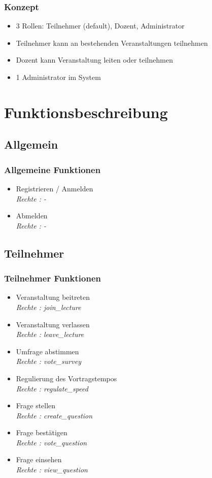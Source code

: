 \documentclass[german,a4paper]{beamer}
\begin{document}
\begin{frame} 
\frametitle{Konzept}
\begin{itemize}
  \item{}
  3 Rollen: Teilnehmer (default), Dozent, Administrator
  \item
  Teilnehmer kann an bestehenden Veranstaltungen teilnehmen
  \item{}
  Dozent kann Veranstaltung leiten oder teilnehmen
  \item{}
  1 Administrator im System 
\end{itemize}
\end{frame}

\section{Funktionsbeschreibung}
\subsection{Allgemein}
\begin{frame} 
\frametitle{Allgemeine Funktionen}
\begin{itemize}
  \item{}
  Registrieren / Anmelden \\
  \quad \emph{Rechte : -}
  \item{} 
  Abmelden  \\
  \quad \emph{Rechte : -}
\end{itemize}
\end{frame}

\subsection{Teilnehmer}
\begin{frame} 
\frametitle{Teilnehmer Funktionen}
\begin{itemize}
  \item{}
  Veranstaltung beitreten \\
  \quad \emph{Rechte : join\_lecture}
  \item{} 
  Veranstaltung verlassen  \\
  \quad \emph{Rechte : leave\_lecture}
  \item{} 
  Umfrage abstimmen  \\
  \quad \emph{Rechte : vote\_survey}
  \item{} 
  Regulierung des Vortragstempos  \\
  \quad \emph{Rechte : regulate\_speed}
  \item{} 
  Frage stellen  \\
  \quad \emph{Rechte : create\_question}
  \item{} 
  Frage best\"{a}tigen  \\
  \quad \emph{Rechte : vote\_question}
  \item{} 
  Frage einsehen  \\
  \quad \emph{Rechte : view\_question}
\end{itemize}
\end{frame}
\end{document}
